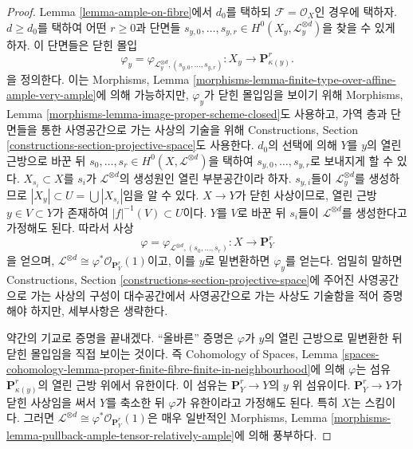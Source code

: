 \begin{proof}
Lemma \ref{lemma-ample-on-fibre}에서 $d_0$를 택하되
$\mathcal{F} = \mathcal{O}_X$인 경우에 택하자.
$d \geq d_0$를 택하여 어떤 $r \geq 0$과 단면들
$s_{y, 0}, \ldots, s_{y, r} \in H^0(X_y, \mathcal{L}_y^{\otimes d})$을
찾을 수 있게 하자. 이 단면들은 닫힌 몰입
$$
\varphi_y =
\varphi_{\mathcal{L}_y^{\otimes d}, (s_{y, 0}, \ldots, s_{y, r})} :
X_y \to \mathbf{P}^r_{\kappa(y)}.
$$
을 정의한다. 이는 Morphisms, Lemma
\ref{morphisms-lemma-finite-type-over-affine-ample-very-ample}에 의해
가능하지만, $\varphi_y$가 닫힌 몰입임을 보이기 위해 Morphisms, Lemma
\ref{morphisms-lemma-image-proper-scheme-closed}도 사용하고, 가역 층과
단면들을 통한 사영공간으로 가는 사상의 기술을 위해 Constructions,
Section \ref{constructions-section-projective-space}도 사용한다.
$d_0$의 선택에 의해 $Y$를 $y$의 열린 근방으로 바꾼 뒤
$s_0, \ldots, s_r \in H^0(X, \mathcal{L}^{\otimes d})$을 택하여
$s_{y, 0}, \ldots, s_{y, r}$로 보내지게 할 수 있다.
$X_{s_i} \subset X$를 $s_i$가 $\mathcal{L}^{\otimes d}$의 생성원인
열린 부분공간이라 하자. $s_{y, i}$들이 $\mathcal{L}_y^{\otimes d}$를
생성하므로 $|X_y| \subset U = \bigcup |X_{s_i}|$임을 알 수 있다.
$X \to Y$가 닫힌 사상이므로, 열린 근방 $y \in V \subset Y$가
존재하여 $|f|^{-1}(V) \subset U$이다. $Y$를 $V$로 바꾼 뒤
$s_i$들이 $\mathcal{L}^{\otimes d}$를 생성한다고 가정해도 된다.
따라서 사상
$$
\varphi = \varphi_{\mathcal{L}^{\otimes d}, (s_0, \ldots, s_r)} :
X \longrightarrow \mathbf{P}^r_Y
$$
을 얻으며, $\mathcal{L}^{\otimes d} \cong
\varphi^*\mathcal{O}_{\mathbf{P}^r_Y}(1)$이고, 이를 $y$로 밑변환하면
$\varphi_y$를 얻는다. 엄밀히 말하면 Constructions, Section
\ref{constructions-section-projective-space}에 주어진 사영공간으로 가는
사상의 구성이 대수공간에서 사영공간으로 가는 사상도 기술함을 적어
증명해야 하지만, 세부사항은 생략한다.

\medskip\noindent
약간의 기교로 증명을 끝내겠다. “올바른” 증명은 $\varphi$가 $y$의
열린 근방으로 밑변환한 뒤 닫힌 몰입임을 직접 보이는 것이다. 즉
Cohomology of Spaces, Lemma
\ref{spaces-cohomology-lemma-proper-finite-fibre-finite-in-neighbourhood}에
의해
$\varphi$는 섬유 $\mathbf{P}^r_{\kappa(y)}$의 열린 근방 위에서
유한이다. 이 섬유는 $\mathbf{P}^r_Y \to Y$의 $y$ 위 섬유이다.
$\mathbf{P}^r_Y \to Y$가 닫힌 사상임을 써서 $Y$를 축소한 뒤
$\varphi$가 유한이라고 가정해도 된다. 특히 $X$는 스킴이다. 그러면
$\mathcal{L}^{\otimes d} \cong
\varphi^*\mathcal{O}_{\mathbf{P}^r_Y}(1)$은 매우 일반적인 Morphisms,
Lemma \ref{morphisms-lemma-pullback-ample-tensor-relatively-ample}에 의해
풍부하다.
\end{proof}

